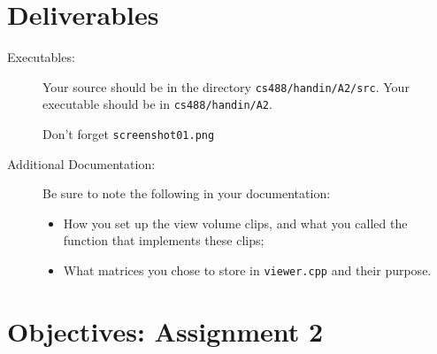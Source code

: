 \section{Deliverables}
\begin{description}
\item[Executables:] \hfill

  Your source should be in the directory {\tt cs488/handin/A2/src}.
  Your executable should be in {\tt cs488/handin/A2}.

  Don't forget \texttt{screenshot01.png}

\item[Additional Documentation:]
Be sure to note the following in your documentation: \hfill
\begin{itemize}
        \item How you set up the view volume clips, and what you called the
                function that implements these clips;
	\item What matrices you chose to store in {\tt viewer.cpp} and 
		their purpose.
\end{itemize}
\end{description}

\newpage
\section{Objectives: \hfill Assignment 2}

 \bigskip

 \bigskip

 \bigskip

 \bigskip


